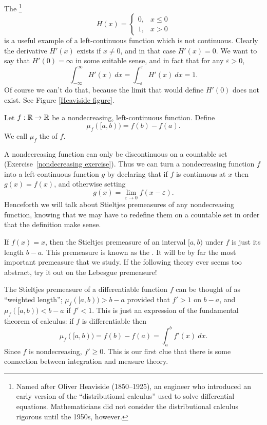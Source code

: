 \begin{example}
The \footnote{Named after Oliver Heaviside (1850--1925), an engineer who introduced an early version of the ``distributional calculus'' used to solve differential equations. Mathematicians did not consider the distributional calculus rigorous until the 1950s, however.}
\[H(x) = \begin{cases}
0, & x \leq 0\\
1, & x > 0
\end{cases}\]
is a useful example of a left-continuous function which is not continuous.
Clearly the derivative $H'(x)$ exists if $x \neq 0$, and in that case $H'(x) = 0$.
We want to say that $H'(0) = \infty$ in some suitable sense, and in fact that for any $\varepsilon > 0$,
\[\int_{-\infty}^{\infty} H'(x)~dx = \int_{-\varepsilon}^{\varepsilon} H'(x)~dx = 1.\]
Of course we can't do that, because the limit that would define $H'(0)$ does not exist.
See Figure \ref{Heaviside figure}.
\end{example}

\begin{definition}
Let $f: \mathbb{R} \to \mathbb{R}$ be a nondecreasing, left-continuous function.
Define
\[\mu_{f}([a, b)) = f(b) - f(a).\]
We call $\mu_{f}$ the  of $f$.
\end{definition}

\begin{subsec}
A nondecreasing function can only be discontinuous on a countable set (Exercise~\ref{nondecreasing exercise}).
Thus we can turn a nondecreasing function $f$ into a left-continuous function $g$ by declaring that if $f$ is continuous at $x$ then $g(x) = f(x)$, and otherwise setting
\[g(x) = \lim_{\varepsilon \to 0} f(x - \varepsilon).\]
Henceforth we will talk about Stieltjes premeasures of any nondecreasing function, knowing that we may have to redefine them on a countable set in order that the definition make sense.
\end{subsec}

\begin{example}
If $f(x) = x$, then the Stieltjes premeasure of an interval $[a, b)$ under $f$ is just its length $b - a$.
This premeasure is known as the .
It will be by far the most important premeasure that we study.
If the following theory ever seems too abstract, try it out on the Lebesgue premeasure!
\end{example}

\begin{example}
The Stieltjes premeasure of a differentiable function $f$ can be thought of as ``weighted length''; $\mu_{f}([a, b)) > b - a$ provided that $f' > 1$ on $b - a$, and $\mu_{f}([a, b)) < b - a$ if $f' < 1$.
This is just an expression of the fundamental theorem of calculus: if $f$ is differentiable then
\[\mu_{f}([a, b)) = f(b) - f(a) = \int_{a}^{b} f'(x)~dx.\]
Since $f$ is nondecreasing, $f' \geq 0$.
This is our first clue that there is some connection between integration and measure theory.
\end{example}

